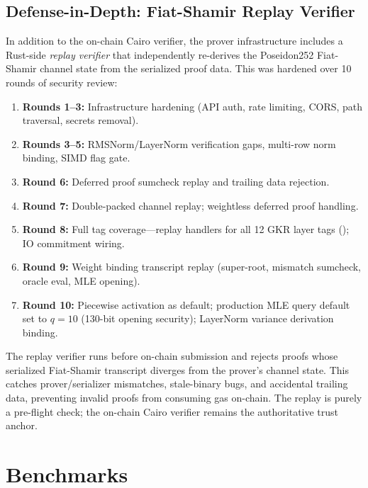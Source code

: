 \documentclass[10pt,twocolumn]{article}
\theoremstyle{definition}
\theoremstyle{remark}
\begin{document}
\subsection{Defense-in-Depth: Fiat-Shamir Replay Verifier}

In addition to the on-chain Cairo verifier, the prover infrastructure
includes a Rust-side \emph{replay verifier} that independently
re-derives the Poseidon252 Fiat-Shamir channel state from the
serialized proof data.
This was hardened over 10 rounds of security review:

\begin{enumerate}[nosep,leftmargin=1.4em]
  \item \textbf{Rounds 1--3:} Infrastructure hardening (API auth,
        rate limiting, CORS, path traversal, secrets removal).
  \item \textbf{Rounds 3--5:} RMSNorm/LayerNorm verification gaps,
        multi-row norm binding, SIMD flag gate.
  \item \textbf{Round 6:} Deferred proof sumcheck replay and
        trailing data rejection.
  \item \textbf{Round 7:} Double-packed channel replay;
        weightless deferred proof handling.
  \item \textbf{Round 8:} Full tag coverage---replay handlers for
        all 12 GKR layer tags (); IO commitment wiring.
  \item \textbf{Round 9:} Weight binding transcript replay
        (super-root, mismatch sumcheck, oracle eval, MLE opening).
  \item \textbf{Round 10:} Piecewise activation as default;
        production MLE query default set to $q\!=\!10$ (130-bit
        opening security); LayerNorm variance derivation binding.
\end{enumerate}

The replay verifier runs before on-chain submission and rejects
proofs whose serialized Fiat-Shamir transcript diverges from
the prover's channel state.
This catches prover/serializer mismatches, stale-binary bugs,
and accidental trailing data, preventing invalid proofs from
consuming gas on-chain.
The replay is purely a pre-flight check; the on-chain Cairo
verifier remains the authoritative trust anchor.


\section{Benchmarks}\label{sec:bench}
\end{document}
